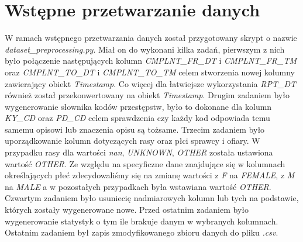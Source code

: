 \documentclass{classrep}
\begin{document}
    \section{Wstępne przetwarzanie danych} {
        W ramach wstępnego przetwarzania danych został przygotowany skrypt o nazwie
        \textit{dataset\_preprocessing.py}. Miał on do wykonani kilka zadań, pierwszym
        z nich było połączenie następujących kolumn \textit{CMPLNT\_FR\_DT} i
        \textit{CMPLNT\_FR\_TM} oraz \textit{CMPLNT\_TO\_DT} i \textit{CMPLNT\_TO\_TM}
        celem stworzenia nowej kolumny zawierający obiekt \textit{Timestamp}. Co więcej
        dla łatwiejsze wykorzystania \textit{RPT\_DT} również został przekonwertowany
        na obiekt \textit{Timestamp}. Drugim zadaniem było wygenerowanie słownika kodów
        przestępstw, było to dokonane dla kolumn \textit{KY\_CD} oraz \textit{PD\_CD}
        celem sprawdzenia czy każdy kod odpowiada temu samemu opisowi lub znaczenia
        opisu są tożsame. Trzecim zadaniem było uporządkowanie kolumn dotyczących rasy
        oraz płci sprawcy i ofiary. W przypadku rasy dla wartości \textit{nan},
        \textit{UNKNOWN}, \textit{OTHER} została ustawiona wartość \textit{OTHER}. Ze
        względu na specyficzne dane znajdujące się w kolumnach określających płeć
        zdecydowaliśmy się na zmianę wartości z \textit{F} na \textit{FEMALE}, z
        \textit{M} na \textit{MALE} a w pozostałych przypadkach była wstawiana wartość
        \textit{OTHER}. Czwartym zadaniem było usuniecię nadmiarowych kolumn lub tych
        na podstawie, których zostały wygenerowane nowe. Przed ostatnim zadaniem było
        wygenerowanie statystyk o tym ile brakuje danym w wybranych kolumnach. Ostatnim
        zadaniem był zapis zmodyfikowanego zbioru danych do pliku \textit{.csv}.
    }
\end{document}
